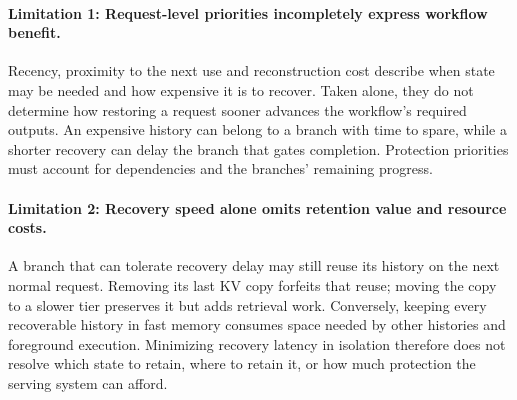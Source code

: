 \paragraph{Limitation 1: Request-level priorities incompletely express
workflow benefit.}
Recency, proximity to the next use and reconstruction cost describe when
state may be needed and how expensive it is to recover. Taken alone,
they do not determine how restoring a request sooner advances the
workflow's required outputs. An expensive history can belong to a branch
with time to spare, while a shorter recovery can delay the branch that
gates completion. Protection priorities must account for dependencies
and the branches' remaining progress.

\paragraph{Limitation 2: Recovery speed alone omits retention value and
resource costs.}
A branch that can tolerate recovery delay may still reuse its history
on the next normal request. Removing its last KV copy forfeits that reuse;
moving the copy to a slower tier preserves it but adds retrieval work.
Conversely, keeping every recoverable history in fast memory consumes
space needed by other histories and foreground execution. Minimizing
recovery latency in isolation therefore does not resolve which state
to retain, where to retain it, or how much protection the serving system
can afford.


